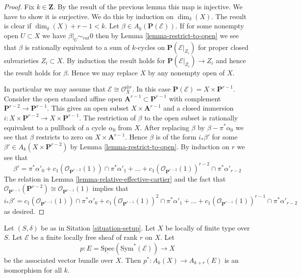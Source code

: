 \begin{proof}
Fix $k \in \mathbf{Z}$.
By the result of the previous lemma this map is injective.
We have to show it is surjective. We do this by induction
on $\dim_\delta(X)$. The result is clear if $\dim_\delta(X) + r - 1 < k$.
Let $\beta \in A_k(\mathbf{P}(\mathcal{E}))$.
If for some nonempty open $U \subset X$ we have $\beta|_U \sim_{rat} 0$
then by Lemma \ref{lemma-restrict-to-open} we see that $\beta$
is rationally equivalent to
a sum of $k$-cycles on $\mathbf{P}(\mathcal{E}|_{Z_i})$ for proper
closed subvarieties $Z_i \subset X$. By induction the result holds
for $\mathbf{P}(\mathcal{E}|_{Z_i}) \to Z_i$ and hence the
result holds for $\beta$. Hence we may replace $X$ by any nonempty
open of $X$.

\medskip\noindent
In particular we may assume that $\mathcal{E} \cong \mathcal{O}_X^{\oplus r}$.
In this case $\mathbf{P}(\mathcal{E}) = X \times \mathbf{P}^{r - 1}$.
Consider the open standard affine open
$\mathbf{A}^{r - 1} \subset \mathbf{P}^{r - 1}$ with complement
$\mathbf{P}^{r - 2} \to \mathbf{P}^{r - 1}$.
This gives an open subset $X \times \mathbf{A}^{r - 1}$ and a
closed immersion
$i : X \times \mathbf{P}^{r - 2} \to X \times \mathbf{P}^{r - 1}$.
The restriction of $\beta$ to the open subset is rationally equivalent
to a pullback of a cycle $\alpha_0$ from $X$. After replacing
$\beta$ by $\beta - \pi^*\alpha_0$ we see that $\beta$ restricts
to zero on $X \times \mathbf{A}^{r - 1}$. Hence $\beta$ is
of the form $i_*\beta'$ for some $\beta' \in A_k(X \times \mathbf{P}^{r - 2})$
by Lemma \ref{lemma-restrict-to-open}. By induction on $r$ we see that
$$
\beta' =
\pi^*\alpha'_0 +
c_1(\mathcal{O}_{\mathbf{P}^{r - 2}}(1)) \cap \pi^*\alpha'_1 + \ldots +
c_1(\mathcal{O}_{\mathbf{P}^{r - 2}}(1))^{r - 2} \cap \pi^*\alpha'_{r-2}
$$
The relation in Lemma \ref{lemma-relative-effective-cartier}
and the fact that
$\mathcal{O}_{\mathbf{P}^{r - 1}}(\mathbf{P}^{r - 2})
\cong \mathcal{O}_{\mathbf{P}^{r - 1}}(1)$ implies
that
$$
i_*\beta' =
c_1(\mathcal{O}_{\mathbf{P}^{r - 1}}(1)) \cap \pi^*\alpha'_0 +
c_1(\mathcal{O}_{\mathbf{P}^{r - 1}}(1))^2 \cap \pi^*\alpha'_1 + \ldots +
c_1(\mathcal{O}_{\mathbf{P}^{r - 1}}(1))^{r - 1} \cap \pi^*\alpha'_{r-2}
$$
as desired.
\end{proof}

\begin{lemma}
\label{lemma-vectorbundle}
Let $(S, \delta)$ be as in Sitation \ref{situation-setup}.
Let $X$ be locally of finite type over $S$.
Let $\mathcal{E}$ be a finite locally free sheaf of rank $r$ on $X$.
Let
$$
p :
E = \underline{\text{Spec}}(\text{Sym}^*(\mathcal{E}))
\longrightarrow
X
$$
be the associated vector bundle over $X$.
Then $p^* : A_k(X) \to A_{k + r}(E)$ is an isomorphism for all $k$.
\end{lemma}

